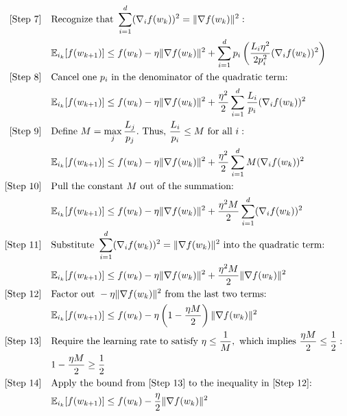 \documentclass{article}
\begin{document}
\begin{align}
    \text{[Step 7]} \quad & \text{Recognize that } \sum_{i=1}^d (\nabla_i f(w_k))^2 = \|\nabla f(w_k)\|^2: \notag \\
    & \mathbb{E}_{i_k}[f(w_{k+1})] \leq f(w_k) - \eta \|\nabla f(w_k)\|^2 + \sum_{i=1}^d p_i \left( \frac{L_i \eta^2}{2 p_i^2} (\nabla_i f(w_k))^2 \right) \\
    \text{[Step 8]} \quad & \text{Cancel one } p_i \text{ in the denominator of the quadratic term:} \notag \\
    & \mathbb{E}_{i_k}[f(w_{k+1})] \leq f(w_k) - \eta \|\nabla f(w_k)\|^2 + \frac{\eta^2}{2} \sum_{i=1}^d \frac{L_i}{p_i} (\nabla_i f(w_k))^2 \\
    \text{[Step 9]} \quad & \text{Define } M = \max_{j} \frac{L_j}{p_j}. \text{ Thus, } \frac{L_i}{p_i} \leq M \text{ for all } i: \notag \\
    & \mathbb{E}_{i_k}[f(w_{k+1})] \leq f(w_k) - \eta \|\nabla f(w_k)\|^2 + \frac{\eta^2}{2} \sum_{i=1}^d M (\nabla_i f(w_k))^2 \\
    \text{[Step 10]} \quad & \text{Pull the constant } M \text{ out of the summation:} \notag \\
    & \mathbb{E}_{i_k}[f(w_{k+1})] \leq f(w_k) - \eta \|\nabla f(w_k)\|^2 + \frac{\eta^2 M}{2} \sum_{i=1}^d (\nabla_i f(w_k))^2 \\
    \text{[Step 11]} \quad & \text{Substitute } \sum_{i=1}^d (\nabla_i f(w_k))^2 = \|\nabla f(w_k)\|^2 \text{ into the quadratic term:} \notag \\
    & \mathbb{E}_{i_k}[f(w_{k+1})] \leq f(w_k) - \eta \|\nabla f(w_k)\|^2 + \frac{\eta^2 M}{2} \|\nabla f(w_k)\|^2 \\
    \text{[Step 12]} \quad & \text{Factor out } -\eta \|\nabla f(w_k)\|^2 \text{ from the last two terms:} \notag \\
    & \mathbb{E}_{i_k}[f(w_{k+1})] \leq f(w_k) - \eta \left( 1 - \frac{\eta M}{2} \right) \|\nabla f(w_k)\|^2 \\
    \text{[Step 13]} \quad & \text{Require the learning rate to satisfy } \eta \leq \frac{1}{M}, \text{ which implies } \frac{\eta M}{2} \leq \frac{1}{2}: \notag \\
    & 1 - \frac{\eta M}{2} \geq \frac{1}{2} \\
    \text{[Step 14]} \quad & \text{Apply the bound from [Step 13] to the inequality in [Step 12]:} \notag \\
    & \mathbb{E}_{i_k}[f(w_{k+1})] \leq f(w_k) - \frac{\eta}{2} \|\nabla f(w_k)\|^2
\end{align}
\end{document}
